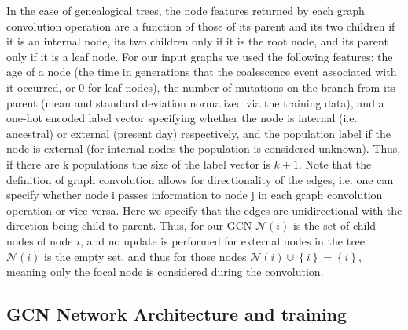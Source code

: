 In the case of genealogical trees, the node features returned by each graph convolution operation are a function of those of its parent and its two children if it is an internal node, its two children only if it is the root node, and its parent only if it is a leaf node. For our input graphs we used the following features: the age of a node (the time in generations that the coalescence event associated with it occurred, or 0 for leaf nodes), the number of mutations on the branch from its parent (mean and standard deviation normalized via the training data), and a one-hot encoded label vector specifying whether the node is internal (i.e. ancestral) or external (present day) respectively, and the population label if the node is external (for internal nodes the population is considered unknown). Thus, if there are k populations the size of the label vector is $k + 1$. Note that the definition of graph convolution allows for directionality of the edges, i.e. one can specify whether node i passes information to node j in each graph convolution operation or vice-versa. Here we specify that the edges are unidirectional with the direction being child to parent. Thus, for our GCN $\mathcal{N}(i)$ is the set of child nodes of node $i$, and no update is performed for external nodes in the tree $\mathcal{N}(i)$ is the empty set, and thus for those nodes $\mathcal{N}(i)\cup \left\{i \right\} = \left\{i \right\}$, meaning only the focal node is considered during the convolution. 

\subsection{GCN Network Architecture and training}
 
